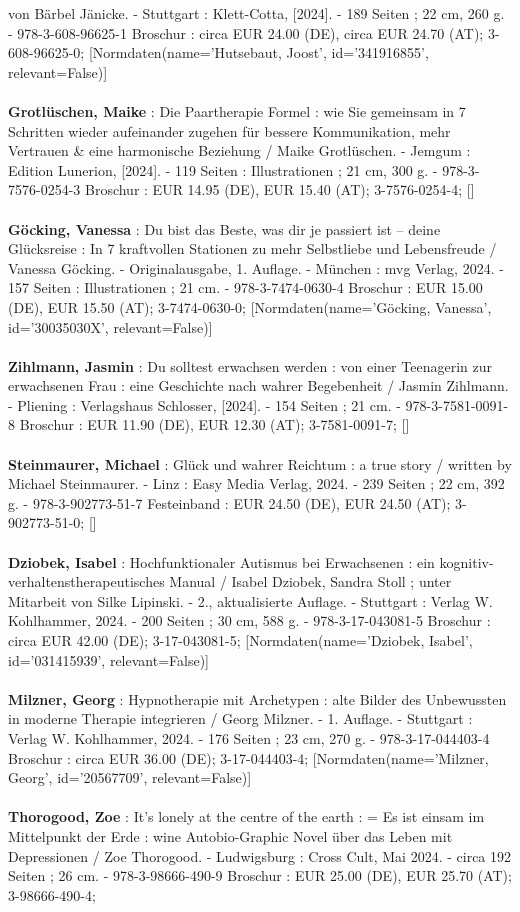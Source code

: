 \documentclass{article}
\begin{document}
\begin{multicols}{3}
von Bärbel Jänicke. - Stuttgart : Klett-Cotta, [2024]. - 189 Seiten ; 22 cm, 260 g. - 978-3-608-96625-1 Broschur : circa EUR 24.00 (DE), circa EUR 24.70 (AT); 3-608-96625-0; [Normdaten(name='Hutsebaut, Joost', id='341916855', relevant=False)]\\\\\textbf{Grotlüschen, Maike} : Die Paartherapie Formel : wie Sie gemeinsam in 7 Schritten wieder aufeinander zugehen für bessere Kommunikation, mehr Vertrauen \& eine harmonische Beziehung  / Maike Grotlüschen. - Jemgum : Edition Lunerion, [2024]. - 119 Seiten : Illustrationen ; 21 cm, 300 g. - 978-3-7576-0254-3 Broschur : EUR 14.95 (DE), EUR 15.40 (AT); 3-7576-0254-4; []\\\\\textbf{Göcking, Vanessa} : Du bist das Beste, was dir je passiert ist – deine Glücksreise : In 7 kraftvollen Stationen zu mehr Selbstliebe und Lebensfreude / Vanessa Göcking. - Originalausgabe, 1. Auflage. - München : mvg Verlag, 2024. - 157 Seiten : Illustrationen ; 21 cm. - 978-3-7474-0630-4 Broschur : EUR 15.00 (DE), EUR 15.50 (AT); 3-7474-0630-0; [Normdaten(name='Göcking, Vanessa', id='30035030X', relevant=False)]\\\\\textbf{Zihlmann, Jasmin} : Du solltest erwachsen werden : von einer Teenagerin zur erwachsenen Frau : eine Geschichte nach wahrer Begebenheit / Jasmin Zihlmann. - Pliening : Verlagshaus Schlosser, [2024]. - 154 Seiten ; 21 cm. - 978-3-7581-0091-8 Broschur : EUR 11.90 (DE), EUR 12.30 (AT); 3-7581-0091-7; []\\\\\textbf{Steinmaurer, Michael} : Glück und wahrer Reichtum : a true story / written by Michael Steinmaurer. - Linz : Easy Media Verlag, 2024. - 239 Seiten ; 22 cm, 392 g. - 978-3-902773-51-7 Festeinband : EUR 24.50 (DE), EUR 24.50 (AT); 3-902773-51-0; []\\\\\textbf{Dziobek, Isabel} : Hochfunktionaler Autismus bei Erwachsenen : ein kognitiv-verhaltenstherapeutisches Manual / Isabel Dziobek, Sandra Stoll ; unter Mitarbeit von Silke Lipinski. - 2., aktualisierte Auflage. - Stuttgart : Verlag W. Kohlhammer, 2024. - 200 Seiten ; 30 cm, 588 g. - 978-3-17-043081-5 Broschur : circa EUR 42.00 (DE); 3-17-043081-5; [Normdaten(name='Dziobek, Isabel', id='031415939', relevant=False)]\\\\\textbf{Milzner, Georg} : Hypnotherapie mit Archetypen : alte Bilder des Unbewussten in moderne Therapie integrieren / Georg Milzner. - 1. Auflage. - Stuttgart : Verlag W. Kohlhammer, 2024. - 176 Seiten ; 23 cm, 270 g. - 978-3-17-044403-4 Broschur : circa EUR 36.00 (DE); 3-17-044403-4; [Normdaten(name='Milzner, Georg', id='20567709', relevant=False)]\\\\\textbf{Thorogood, Zoe} : It's lonely at the centre of the earth : = Es ist einsam im Mittelpunkt der Erde : wine Autobio-Graphic Novel über das Leben mit Depressionen / Zoe Thorogood. - Ludwigsburg : Cross Cult, Mai 2024. - circa 192 Seiten ; 26 cm. - 978-3-98666-490-9 Broschur : EUR 25.00 (DE), EUR 25.70 (AT); 3-98666-490-4; 
\end{multicols}
\end{document}
